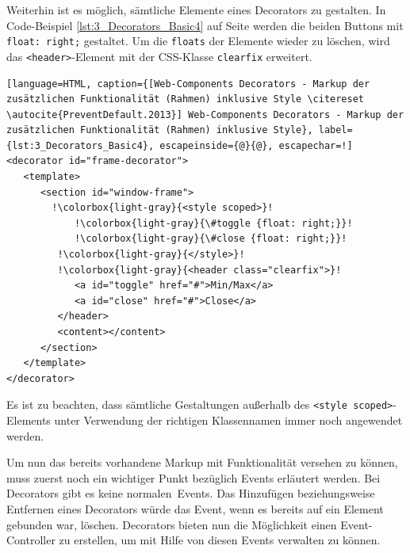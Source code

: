 Weiterhin ist es möglich, sämtliche Elemente eines Decorators zu gestalten. In Code-Beispiel \ref{lst:3_Decorators_Basic4} auf Seite \pageref{lst:3_Decorators_Basic4} werden die beiden Buttons mit \lstinline|float: right;| gestaltet. Um die \lstinline|floats| der Elemente wieder zu löschen, wird das \lstinline|<header>|-Element mit der CSS-Klasse \lstinline|clearfix| erweitert.

\begin{lstlisting}[language=HTML, caption={[Web-Components Decorators - Markup der zusätzlichen Funktionalität (Rahmen) inklusive Style \citereset \autocite{PreventDefault.2013}] Web-Components Decorators - Markup der zusätzlichen Funktionalität (Rahmen) inklusive Style}, label={lst:3_Decorators_Basic4}, escapeinside={@}{@}, escapechar=!]
<decorator id="frame-decorator">
   <template>
      <section id="window-frame">
        !\colorbox{light-gray}{<style scoped>}!
            !\colorbox{light-gray}{\#toggle {float: right;}}!
            !\colorbox{light-gray}{\#close {float: right;}}!
         !\colorbox{light-gray}{</style>}!
         !\colorbox{light-gray}{<header class="clearfix">}!
            <a id="toggle" href="#">Min/Max</a>
            <a id="close" href="#">Close</a>
         </header>
         <content></content>
      </section>
   </template>
</decorator>
\end{lstlisting}

Es ist zu beachten, dass sämtliche Gestaltungen außerhalb des \lstinline|<style scoped>|-Elements unter Verwendung der richtigen Klassennamen immer noch angewendet werden.

Um nun das bereits vorhandene Markup mit Funktionalität versehen zu können, muss zuerst noch ein wichtiger Punkt bezüglich Events erläutert werden. Bei Decorators gibt es keine \glqq normalen\grqq\ Events. Das Hinzufügen beziehungsweise Entfernen eines Decorators würde das Event, wenn es bereits auf ein Element gebunden war, löschen. Decorators bieten nun die Möglichkeit einen Event-Controller zu erstellen, um mit Hilfe von diesen Events verwalten zu können.

